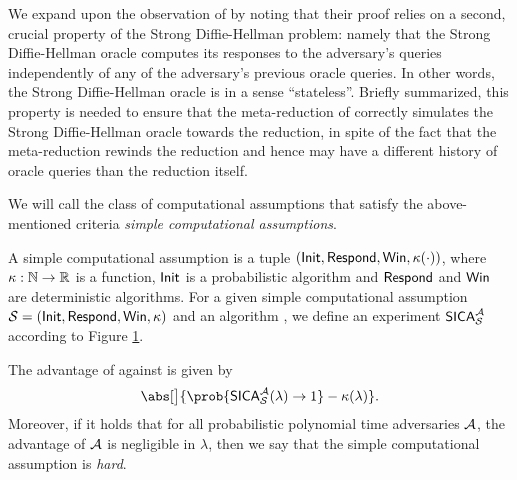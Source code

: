 We expand upon the observation of 
by noting that their proof relies on a second, crucial property of the Strong Diffie-Hellman problem:
namely that the Strong Diffie-Hellman oracle computes its
responses to the adversary's queries
independently of any of the adversary's previous oracle queries.
In other words, the Strong Diffie-Hellman oracle is in a sense ``stateless''.
Briefly summarized,
this property is needed to ensure that
the meta-reduction of 
correctly simulates the Strong Diffie-Hellman oracle
towards the reduction, in spite of the fact
that the meta-reduction rewinds the reduction
and hence may have a different history of oracle queries
than the reduction itself.

We will call the class of computational assumptions
that satisfy the above-mentioned criteria
\emph{simple computational assumptions}.


\begin{definition}\label{def:simple}
  A simple computational assumption is a tuple \((\mathsf{Init},\mathsf{Respond},\mathsf{Win},\kappa(\cdot))\),
  where \(\kappa : \mathbb{N} \to \mathbb{R}\) is a function,
  \(\mathsf{Init}\) is a probabilistic algorithm
  and \(\mathsf{Respond}\) and \(\mathsf{Win}\) are deterministic algorithms.
  For a given simple computational assumption \(\mathcal{S} = (\mathsf{Init},\mathsf{Respond},\mathsf{Win},\kappa)\)
  and an algorithm \advA, we define an experiment \(\mathsf{SICA}_{\mathcal{S}}^{\mathcal{A}}\)
  according to Figure \ref{fig:simple}.


  The advantage of \advA{} against \Simple is given by
  \begin{equation}\label{eq:simple}
    \abs[\big]{\prob{\SICA_{\Simple}^{\advA}(\lambda) \to 1} - \kappa(\lambda)}.
  \end{equation}
  Moreover, if it holds that for all probabilistic polynomial time adversaries \(\mathcal{A}\),
  the advantage of \(\mathcal{A}\) is negligible in \(\lambda\),
  then we say that the simple computational assumption is \emph{hard}.
\end{definition}

\begin{figure}
  \begin{pchstack}[center,space=0.5cm]
  \end{pchstack}\caption{}\label{fig:simple}
\end{figure}

